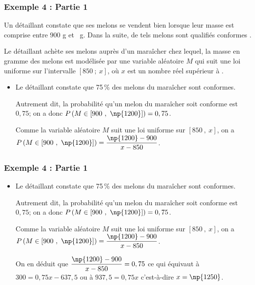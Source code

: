 \documentclass[xcolor=svgnames,t,final]{beamer}
\begin{document}
\begin{frame}

\frametitle{Exemple 4 : Partie 1}
\label{exemple4}

Un détaillant constate que ses melons se vendent bien lorsque leur masse est comprise entre $900$ g et
~g. Dans la suite, de tels melons sont qualifiés \og conformes \fg.

Le détaillant achète ses melons auprès d'un   maraîcher chez lequel, la masse en gramme  des melons est
 modélisée par une variable aléatoire $M$
qui suit une loi uniforme sur l'intervalle $[850~;~x]$, où $x$ est un nombre réel supérieur à .


\begin{itemize}

\pause \item Le détaillant constate que 75\,\% des melons du maraîcher sont conformes. %

Autrement dit, la probabilité qu'un melon du maraîcher soit conforme est $0,75$; on a donc $P\left ( M \in [ 900~,~\np{1200}] \right ) = 0,75$.

Comme la variable aléatoire $M$ suit une loi uniforme sur $[ 850~,~x ]$, on a\\
$P\left ( M \in [ 900~,~\np{1200}]  \right ) = \dfrac{\np{1200}-900}{x-850}$.



\end{itemize}

\end{frame}



\begin{frame}

\frametitle{Exemple 4 : Partie 1}



\begin{itemize}

 \item Le détaillant constate que 75\,\% des melons du maraîcher sont conformes. %

Autrement dit, la probabilité qu'un melon du maraîcher soit conforme est $0,75$; on a donc $P\left ( M \in [ 900~,~\np{1200}] \right ) = 0,75$.

Comme la variable aléatoire $M$ suit une loi uniforme sur $[ 850~,~x ]$, on a\\
$P\left ( M \in [ 900~,~\np{1200}]  \right ) = \dfrac{\np{1200}-900}{x-850}$.

On en déduit que $\dfrac{\np{1200}-900}{x-850} = 0,75$ ce qui équivaut à
$300 = 0,75x - 637,5$ ou à $937,5 = 0,75x$ c'est-à-dire $x=\np{1250}$.

\end{itemize}

\end{frame}
\end{document}
